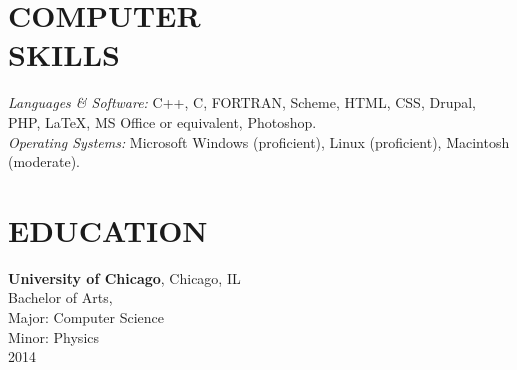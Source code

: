 \documentclass[line,margin]{res}
\begin{document}
\begin{resume}
  \section{COMPUTER \\ SKILLS} {\sl Languages \& Software:}
  C++, C, FORTRAN, Scheme, HTML, CSS, Drupal, PHP, \LaTeX, MS Office or equivalent,
  Photoshop. \\
  {\sl Operating Systems:} Microsoft Windows
  (proficient), Linux (proficient), Macintosh (moderate).
  
  
  \section{EDUCATION} {\bf University of Chicago}, Chicago, IL \\
  Bachelor of Arts,\\
  Major: Computer Science\\
  Minor: Physics\\
  2014
  
  
\end{resume}
\end{document}

